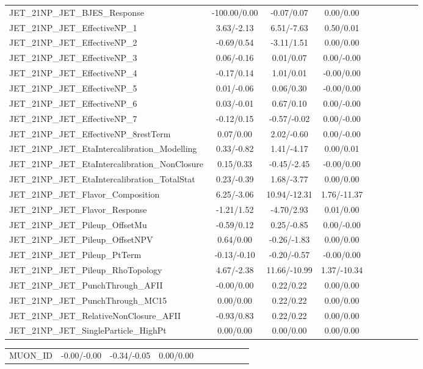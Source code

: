 \begin{table}[h]
\begin{center}
\begin{tabular}{l|ccccccccc}
JET\_21NP\_JET\_BJES\_Response &-100.00/0.00 &-0.07/0.07 &0.00/0.00 \\
JET\_21NP\_JET\_EffectiveNP\_1 &3.63/-2.13 &6.51/-7.63 &0.50/0.01 \\
JET\_21NP\_JET\_EffectiveNP\_2 &-0.69/0.54 &-3.11/1.51 &0.00/0.00 \\
JET\_21NP\_JET\_EffectiveNP\_3 &0.06/-0.16 &0.01/0.07 &0.00/-0.00 \\
JET\_21NP\_JET\_EffectiveNP\_4 &-0.17/0.14 &1.01/0.01 &-0.00/0.00 \\
JET\_21NP\_JET\_EffectiveNP\_5 &0.01/-0.06 &0.06/0.30 &-0.00/0.00 \\
JET\_21NP\_JET\_EffectiveNP\_6 &0.03/-0.01 &0.67/0.10 &0.00/-0.00 \\
JET\_21NP\_JET\_EffectiveNP\_7 &-0.12/0.15 &-0.57/-0.02 &0.00/-0.00 \\
JET\_21NP\_JET\_EffectiveNP\_8restTerm &0.07/0.00 &2.02/-0.60 &0.00/-0.00 \\
JET\_21NP\_JET\_EtaIntercalibration\_Modelling &0.33/-0.82 &1.41/-4.17 &0.00/0.01 \\
JET\_21NP\_JET\_EtaIntercalibration\_NonClosure &0.15/0.33 &-0.45/-2.45 &-0.00/0.00 \\
JET\_21NP\_JET\_EtaIntercalibration\_TotalStat &0.23/-0.39 &1.68/-3.77 &0.00/0.00 \\
JET\_21NP\_JET\_Flavor\_Composition &6.25/-3.06 &10.94/-12.31 &1.76/-11.37 \\
JET\_21NP\_JET\_Flavor\_Response &-1.21/1.52 &-4.70/2.93 &0.01/0.00 \\
JET\_21NP\_JET\_Pileup\_OffsetMu &-0.59/0.12 &0.25/-0.85 &0.00/-0.00 \\
JET\_21NP\_JET\_Pileup\_OffsetNPV &0.64/0.00 &-0.26/-1.83 &0.00/0.00 \\
JET\_21NP\_JET\_Pileup\_PtTerm &-0.13/-0.10 &-0.20/-0.57 &-0.00/0.00 \\
JET\_21NP\_JET\_Pileup\_RhoTopology &4.67/-2.38 &11.66/-10.99 &1.37/-10.34 \\
JET\_21NP\_JET\_PunchThrough\_AFII &-0.00/0.00 &0.22/0.22 &0.00/0.00 \\
JET\_21NP\_JET\_PunchThrough\_MC15 &0.00/0.00 &0.22/0.22 &0.00/0.00 \\
JET\_21NP\_JET\_RelativeNonClosure\_AFII &-0.93/0.83 &0.22/0.22 &0.00/0.00 \\
JET\_21NP\_JET\_SingleParticle\_HighPt &0.00/0.00 &0.00/0.00 &0.00/0.00 \\
\hline \end{tabular} \end{center} \end{table} \begin{table}[h] \scriptsize \begin{center} \begin{tabular}{l|ccccccccc} \hline MUON\_ID &-0.00/-0.00 &-0.34/-0.05 &0.00/0.00 \\

\end{tabular}
\end{center}
\end{table}
